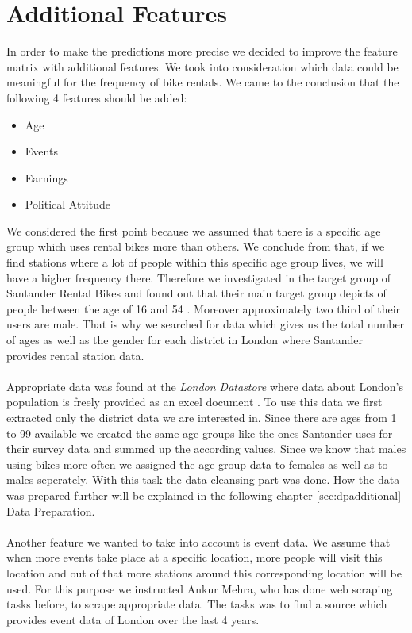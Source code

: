
\section{Additional Features}
In order to make the predictions more precise we decided to improve the feature matrix with additional features.
We took into consideration which data could be meaningful for the frequency of bike rentals.
We came to the conclusion that the following 4 features should be added:
\begin{itemize}
\item Age
\item Events
\item Earnings
\item Political Attitude
\end{itemize}
We considered the first point because we assumed that there is a specific age group which uses rental bikes more than others. We conclude from that, if we find stations where a lot of people within this specific age group lives, we will have a higher frequency there. Therefore we investigated in the target group of Santander Rental Bikes and found out that their main target group depicts of people between the age of 16 and 54 \cite{Santander}. Moreover approximately two third of their users are male. That is why we searched for data which gives us the total number of ages as well as the gender for each district in London where Santander provides rental station data. \\\\
Appropriate data was found at the \emph{London Datastore} where data about London's population is freely provided as an excel document \cite{LondonData}. To use this data we first extracted only the district data we are interested in. Since there are ages from 1 to 99 available we created the same age groups like the ones Santander uses for their survey data and summed up the according values. Since we know that males using bikes more often we assigned the age group data to females as well as to males seperately. With this task the data cleansing part was done. How the data was prepared further will be explained in the following chapter \ref{sec:dpadditional} Data Preparation.\\\\
Another feature we wanted to take into account is event data. We assume that when more events take place at a specific location, more people will visit this location and out of that more stations around this corresponding location will be used.
For this purpose we instructed Ankur Mehra, who has done web scraping tasks before, to scrape appropriate data. The tasks was to find a source which provides event data of London over the last 4 years.\\\\
